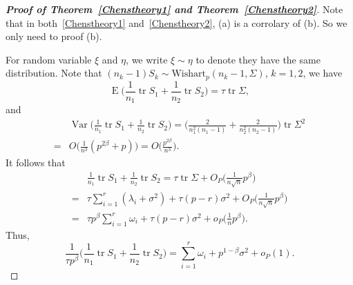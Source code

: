 \documentclass[review]{elsarticle}
\DeclareMathOperator{\mytr}{tr}
\DeclareMathOperator{\myE}{E}
\DeclareMathOperator{\myVar}{Var}
\theoremstyle{plain}
\theoremstyle{definition}
\theoremstyle{remark}
\begin{document}
\begin{proof}[\textbf{Proof of Theorem~\ref{Chenstheory1} and Theorem~\ref{Chenstheory2}}]
    Note that in both~\ref{Chenstheory1} and~\ref{Chenstheory2}, (a) is a corrolary of (b). So we only need to proof (b).

For random variable $\xi$ and $\eta$,
  we write $\xi\sim \eta$ to denote they have the same distribution.
    Note that $(n_k-1)S_k\sim \text{Wishart}_p(n_k-1,\Sigma)$, $k=1,2$, we have %
%
    $$
 \myE\Big(\frac{1}{n_1}\mytr S_1+\frac{1}{n_2}\mytr S_2\Big)=\tau \mytr\Sigma,
    $$
    and
    $$
    \begin{aligned}
        &\myVar\Big(\frac{1}{n_1}\mytr S_1+\frac{1}{n_2}\mytr S_2\Big)=
        \Big(\frac{2}{n_1^2(n_1-1)}+\frac{2}{n_2^2(n_2-1)}\Big)\mytr \Sigma^2\\
        =&
    O\Big(\frac{1}{n^3}(p^{2\beta}+p)\Big)=O\Big(\frac{p^{2\beta}}{n^3}\Big).
    \end{aligned}
    $$
    It follows that
    $$
    \begin{aligned}
        &\frac{1}{n_1}\mytr S_1+\frac{1}{n_2}\mytr S_2=
    \tau \mytr \Sigma+O_P\Big(\frac{1}{n\sqrt{n}}p^{\beta}\Big)\\
        =&\tau \sum_{i=1}^r (\lambda_i+\sigma^2)+\tau(p-r)\sigma^2+O_P\Big(\frac{1}{n\sqrt{n}}p^{\beta}\Big)\\
        =&\tau p^{\beta} \sum_{i=1}^r \omega_i+\tau(p-r)\sigma^2+o_P\Big(\frac{1}{n}p^{\beta}\Big).
    \end{aligned}
    $$
Thus,
        \begin{equation}\label{eq:kkk1}
        \frac{1}{\tau p^\beta}\big(\frac{1}{n_1}\mytr S_1+\frac{1}{n_2}\mytr S_2\big)
        =\sum_{i=1}^r \omega_i+p^{1-\beta}\sigma^2+o_P(1).
        \end{equation}


\end{proof}
\end{document}
